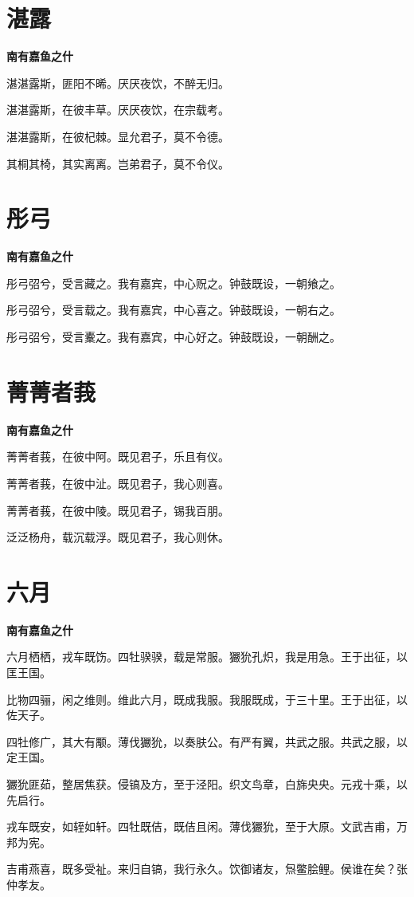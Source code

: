 \documentclass[12pt,a4paper]{ctexbook}
\begin{document}
\section{湛露}
\textbf{南有嘉鱼之什}\par\vspace{0.5em}
湛湛露斯，匪阳不晞。厌厌夜饮，不醉无归。\par
湛湛露斯，在彼丰草。厌厌夜饮，在宗载考。\par
湛湛露斯，在彼杞棘。显允君子，莫不令德。\par
其桐其椅，其实离离。岂弟君子，莫不令仪。\par

\section{彤弓}
\textbf{南有嘉鱼之什}\par\vspace{0.5em}
彤弓弨兮，受言藏之。我有嘉宾，中心贶之。钟鼓既设，一朝飨之。\par
彤弓弨兮，受言载之。我有嘉宾，中心喜之。钟鼓既设，一朝右之。\par
彤弓弨兮，受言櫜之。我有嘉宾，中心好之。钟鼓既设，一朝酬之。\par

\section{菁菁者莪}
\textbf{南有嘉鱼之什}\par\vspace{0.5em}
菁菁者莪，在彼中阿。既见君子，乐且有仪。\par
菁菁者莪，在彼中沚。既见君子，我心则喜。\par
菁菁者莪，在彼中陵。既见君子，锡我百朋。\par
泛泛杨舟，载沉载浮。既见君子，我心则休。\par

\section{六月}
\textbf{南有嘉鱼之什}\par\vspace{0.5em}
六月栖栖，戎车既饬。四牡骙骙，载是常服。玁狁孔炽，我是用急。王于出征，以匡王国。\par
比物四骊，闲之维则。维此六月，既成我服。我服既成，于三十里。王于出征，以佐天子。\par
四牡修广，其大有颙。薄伐玁狁，以奏肤公。有严有翼，共武之服。共武之服，以定王国。\par
玁狁匪茹，整居焦获。侵镐及方，至于泾阳。织文鸟章，白旆央央。元戎十乘，以先启行。\par
戎车既安，如轾如轩。四牡既佶，既佶且闲。薄伐玁狁，至于大原。文武吉甫，万邦为宪。\par
吉甫燕喜，既多受祉。来归自镐，我行永久。饮御诸友，炰鳖脍鲤。侯谁在矣？张仲孝友。\par
\end{document}
